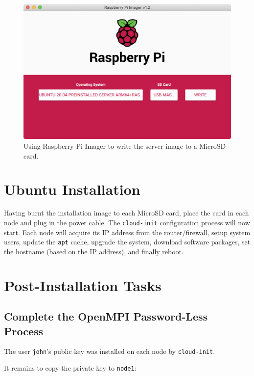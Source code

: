 \documentclass{report}
\begin{document}
\begin{figure}[H]
	\centering	
	\includegraphics[width=1.0\textwidth]{screenshots/imager-write.png}
	\caption{Using Raspberry Pi Imager to write the server image to a MicroSD card.}
\end{figure}



%
%
\section{Ubuntu Installation}

Having burnt the installation image to each MicroSD card, place the card in each node and plug in the power cable. The \verb|cloud-init| configuration process will now start. Each node will acquire its IP address from the router/firewall, setup system users, update the \verb|apt| cache, upgrade the system, download software packages, set the hostname (based on the IP address), and finally reboot.


%
%
\section{Post-Installation Tasks}


%
%
\subsection{Complete the OpenMPI Password-Less Process}

The user \verb|john|'s public key was installed on each node by \verb|cloud-init|.

It remains to copy the private key to \verb|node1|:
\end{document}
